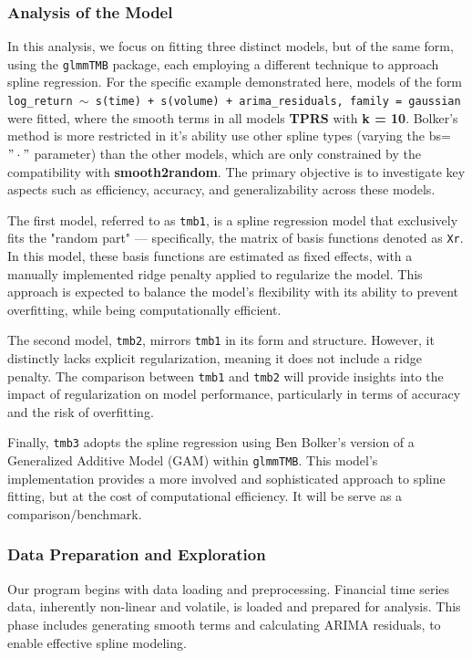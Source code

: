 \documentclass[12pt, twoside,hidelinks]{article}
\theoremstyle{definition}
\numberwithin{equation}{section}
\begin{document}
\subsubsection{Analysis of the Model}

In this analysis, we focus on fitting three distinct models, but of the same form, using the \texttt{glmmTMB} package, each employing a different technique to approach spline regression. For the specific example demonstrated here, models of the form \texttt{log\_return $\sim$ s(time) + s(volume) + arima\_residuals, family = gaussian} were fitted, where the smooth terms in all models \textbf{TPRS} with \textbf{k = 10}. Bolker's method is more restricted in it's ability use other spline types (varying the bs=$"\cdot"$ parameter) than the other models, which are only constrained by the compatibility with \textbf{smooth2random}. The primary objective is to investigate key aspects such as efficiency, accuracy, and generalizability across these models.
\newline

The first model, referred to as \texttt{tmb1}, is a spline regression model that exclusively fits the "random part" — specifically, the matrix of basis functions denoted as \texttt{Xr}. In this model, these basis functions are estimated as fixed effects, with a manually implemented ridge penalty applied to regularize the model. This approach is expected to balance the model's flexibility with its ability to prevent overfitting, while being computationally efficient.
\newline

The second model, \texttt{tmb2}, mirrors \texttt{tmb1} in its form and structure. However, it distinctly lacks explicit regularization, meaning it does not include a ridge penalty. The comparison between \texttt{tmb1} and \texttt{tmb2} will provide insights into the impact of regularization on model performance, particularly in terms of accuracy and the risk of overfitting.
\newline

Finally, \texttt{tmb3} adopts the spline regression using Ben Bolker's version of a Generalized Additive Model (GAM) within \texttt{glmmTMB}. This model's implementation provides a more involved and sophisticated approach to spline fitting, but at the cost of computational efficiency. It will be serve as a comparison/benchmark. 


\subsubsection*{Data Preparation and Exploration}
Our program begins with data loading and preprocessing. Financial time series data, inherently non-linear and volatile, is loaded and prepared for analysis. This phase includes generating smooth terms and calculating ARIMA residuals, to enable effective spline modeling. 
\newline
\end{document}
